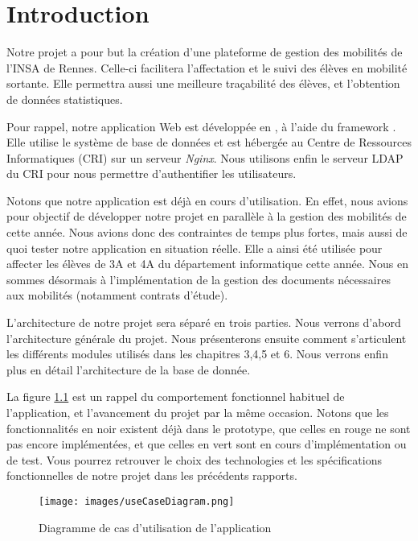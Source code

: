 \chapter{Introduction}

Notre projet a pour but la création d'une plateforme de gestion des mobilités de l'INSA de Rennes. Celle-ci facilitera l'affectation et le suivi des élèves en mobilité sortante. Elle permettra aussi une meilleure traçabilité des élèves, et l'obtention de données statistiques.

 Pour rappel, notre application Web est développée en \php, à l'aide du framework \symfony. Elle utilise le système de base de données \mdb et est hébergée au Centre de Ressources Informatiques (CRI) sur un serveur \textit{Nginx}. Nous utilisons enfin le serveur LDAP du CRI pour nous permettre d'authentifier les utilisateurs.

\bigbreak

Notons que notre application est déjà en cours d'utilisation. En effet, nous avions pour objectif de développer notre projet en parallèle à la gestion des mobilités de cette année. Nous avions donc des contraintes de temps plus fortes, mais aussi de quoi tester notre application en situation réelle. Elle a ainsi été utilisée pour affecter les élèves de 3A et 4A du département informatique cette année. Nous en sommes désormais à l'implémentation de la gestion des documents nécessaires aux mobilités (notamment contrats d'étude).

\bigbreak

L'architecture de notre projet sera séparé en trois parties. Nous verrons d'abord l'architecture générale du projet. Nous présenterons ensuite comment s'articulent les différents modules utilisés dans les chapitres 3,4,5 et 6. Nous verrons enfin plus en détail l'architecture de la base de donnée.

\bigbreak
La figure \ref{useCase} est un rappel du comportement fonctionnel habituel de l'application, et l'avancement du projet par la même occasion. Notons que les fonctionnalités en noir existent déjà dans le prototype, que celles en rouge ne sont pas encore implémentées, et que celles en vert sont en cours d'implémentation ou de test. 
\bigbreak
Vous pourrez retrouver le choix des technologies et les spécifications fonctionnelles de notre projet dans les précédents rapports.

\begin{figure}
	\centering
	\texttt{[image: images/useCaseDiagram.png]}
	\caption{Diagramme de cas d'utilisation de l'application}
	\label{useCase}
\end{figure}